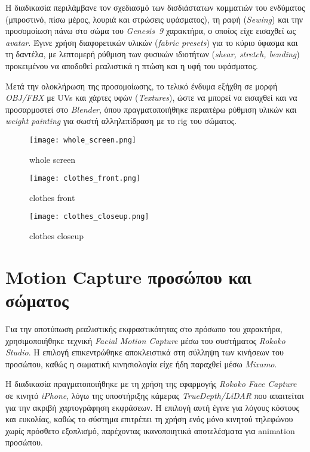 Η διαδικασία περιλάμβανε τον σχεδιασμό των δισδιάστατων κομματιών του ενδύματος 
(μπροστινό, πίσω μέρος, λουριά και στρώσεις υφάσματος), τη ραφή (\textit{Sewing}) 
και την προσομοίωση πάνω στο σώμα του \textit{Genesis~9} χαρακτήρα, 
ο οποίος είχε εισαχθεί ως \textit{avatar}. 
Έγινε χρήση διαφορετικών υλικών (\textit{fabric presets}) για το κύριο ύφασμα και τη δαντέλα, 
με λεπτομερή ρύθμιση των φυσικών ιδιοτήτων (\textit{shear, stretch, bending}) 
προκειμένου να αποδοθεί ρεαλιστικά η πτώση και η υφή του υφάσματος.

Μετά την ολοκλήρωση της προσομοίωσης, το τελικό ένδυμα εξήχθη σε μορφή 
\textit{OBJ/FBX} με UVs και χάρτες υφών (\textit{Textures}), 
ώστε να μπορεί να εισαχθεί και να προσαρμοστεί στο \textit{Blender}, 
όπου πραγματοποιήθηκε περαιτέρω ρύθμιση υλικών και \textit{weight painting} 
για σωστή αλληλεπίδραση με το rig του σώματος.

\begin{figure}[H]
    \centering
    \texttt{[image: whole\_screen.png]}
    \caption{whole screen}
    \label{fig:placeholder}
\end{figure}
\begin{figure}[H]
    \centering
    \texttt{[image: clothes\_front.png]}
    \caption{clothes front}
    \label{fig:placeholder}
\end{figure}
\begin{figure}[H]
    \centering
    \texttt{[image: clothes\_closeup.png]}
    \caption{clothes closeup}
    \label{fig:placeholder}
\end{figure}









\section{Motion Capture προσώπου και σώματος}


Για την αποτύπωση ρεαλιστικής εκφραστικότητας στο πρόσωπο του χαρακτήρα, 
χρησιμοποιήθηκε τεχνική \textit{Facial Motion Capture} μέσω του συστήματος 
\textit{Rokoko Studio}. Η επιλογή επικεντρώθηκε αποκλειστικά στη σύλληψη των κινήσεων 
του προσώπου, καθώς η σωματική κινησιολογία είχε ήδη παραχθεί μέσω \textit{Mixamo}.

Η διαδικασία πραγματοποιήθηκε με τη χρήση της εφαρμογής \textit{Rokoko Face Capture} 
σε κινητό \textit{iPhone}, λόγω της υποστήριξης κάμερας \textit{TrueDepth/LiDAR} 
που απαιτείται για την ακριβή χαρτογράφηση εκφράσεων. 
Η επιλογή αυτή έγινε για λόγους κόστους και ευκολίας, καθώς το σύστημα επιτρέπει 
τη χρήση ενός μόνο κινητού τηλεφώνου χωρίς πρόσθετο εξοπλισμό, 
παρέχοντας ικανοποιητικά αποτελέσματα για animation προσώπου.


